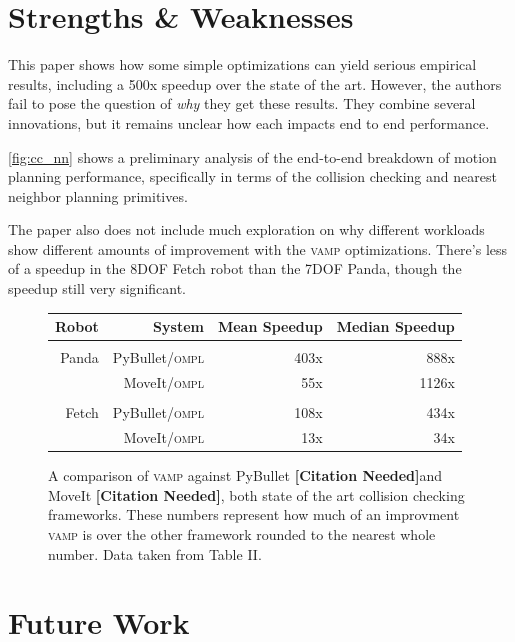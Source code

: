 \documentclass{article}
\newcommand{\citationneeded}{\textbf{\color{blue}[Citation Needed]}}
\begin{document}
\section{Strengths \& Weaknesses}

This paper shows how some simple optimizations can yield serious empirical results, including a 500x speedup over the state of the art. However, the authors fail to pose the question of \textit{why} they get these results. They combine several innovations, but it remains unclear how each impacts end to end performance.

\ref{fig:cc_nn} shows a preliminary analysis of the end-to-end breakdown of motion planning performance, specifically in terms of the collision checking and nearest neighbor planning primitives.

The paper also does not include much exploration on why different workloads show different amounts of improvement with the \textsc{vamp} optimizations. There’s less of a speedup in the 8DOF Fetch robot than the 7DOF Panda, though the speedup still very significant. 


\begin{figure}
\label{fig:data_table}
\begin{tabular}{r|r|r|r|}
Robot & System & Mean Speedup & Median Speedup \\
\hline \\
Panda & PyBullet/\textsc{ompl} & 403x & 888x \\
 & MoveIt/\textsc{ompl} & 55x & 1126x \\
\hline \\
Fetch & PyBullet/\textsc{ompl} & 108x & 434x \\
 & MoveIt/\textsc{ompl} & 13x & 34x \\
\end{tabular}
\caption{A comparison of \textsc{vamp} against PyBullet \citationneeded and MoveIt \citationneeded, both state of the art collision checking frameworks. These numbers represent how much of an improvment \textsc{vamp} is over the other framework rounded to the nearest whole number. Data taken from \cite{paper:MiM} Table II.}
\end{figure}

\section{Future Work}
\end{document}
